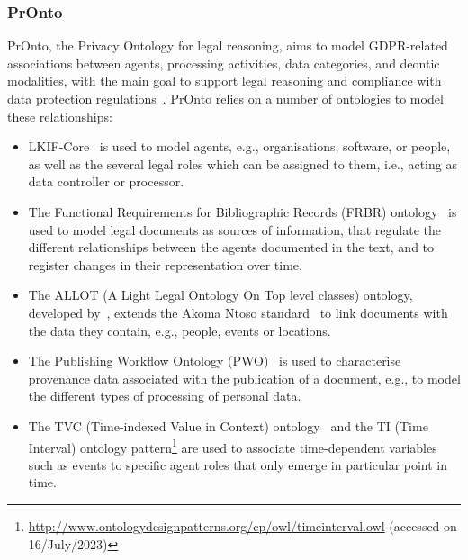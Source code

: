 \subsubsection{PrOnto}
\label{sec:pronto}

PrOnto, the Privacy Ontology for legal reasoning, aims to model GDPR-related associations between agents, processing activities, data categories, and deontic modalities, with the main goal to support legal reasoning and compliance with data protection regulations~\citep{ko_pronto_2018}.
PrOnto relies on a number of ontologies to model these relationships:
\begin{itemize}
    \item LKIF-Core~\citep{hoekstra_lkif_2007} is used to model agents, e.g., organisations, software, or people, as well as the several legal roles which can be assigned to them, i.e., acting as data controller or processor.
    \item The Functional Requirements for Bibliographic Records (FRBR) ontology~\citep{byrum_functional_2009} is used to model legal documents as sources of information, that regulate the different relationships between the agents documented in the text, and to register changes in their representation over time. %
    \item The ALLOT (A Light Legal Ontology On Top level classes) ontology, developed by~\citep{barabucci_managing_2010}, extends the Akoma Ntoso standard~\citep{palmirani_akoma-ntoso_2011} to link documents with the data they contain, e.g., people, events or locations.
    \item The Publishing Workflow Ontology (PWO)~\citep{gangemi_publishing_2017} is used to characterise provenance data associated with the publication of a document, e.g., to model the different types of processing of personal data.
    \item The TVC (Time-indexed Value in Context) ontology~\citep{peroni_semantic_2014} and the TI (Time Interval) ontology pattern\footnote{\url{http://www.ontologydesignpatterns.org/cp/owl/timeinterval.owl} (accessed on 16/July/2023)} are used to associate time-dependent variables such as events to specific agent roles that only emerge in particular point in time.
\end{itemize}

